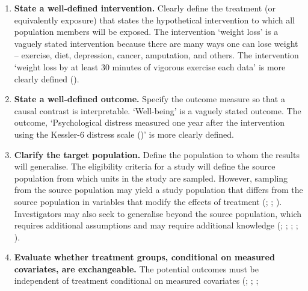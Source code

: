 \documentclass[
  single column]{article}
\begin{document}
\begin{enumerate}
\def\labelenumi{\arabic{enumi}.}
\item
  \textbf{State a well-defined intervention.} Clearly define the
  treatment (or equivalently exposure) that states the hypothetical
  intervention to which all population members will be exposed. The
  intervention `weight loss' is a vaguely stated intervention because
  there are many ways one can lose weight -- exercise, diet, depression,
  cancer, amputation, and others. The intervention `weight loss by at
  least 30 minutes of vigorous exercise each data' is more clearly
  defined
  ().
\item
  \textbf{State a well-defined outcome.} Specify the outcome measure so
  that a causal contrast is interpretable. `Well-being' is a vaguely
  stated outcome. The outcome, `Psychological distress measured one year
  after the intervention using the Kessler-6 distress scale
  ()' is more
  clearly defined.
\item
  \textbf{Clarify the target population.} Define the population to whom
  the results will generalise. The eligibility criteria for a study will
  define the source population from which units in the study are
  sampled. However, sampling from the source population may yield a
  study population that differs from the source population in variables
  that modify the effects of treatment
  (;
  ;
  ).
  Investigators may also seek to generalise beyond the source
  population, which requires additional assumptions and may require
  additional knowledge (; ;
  ;
  ;
  ).
\item
  \textbf{Evaluate whether treatment groups, conditional on measured
  covariates, are exchangeable.} The potential outcomes must be
  independent of treatment conditional on measured covariates
  (;
  ;
  ;

\end{enumerate}
\end{document}
